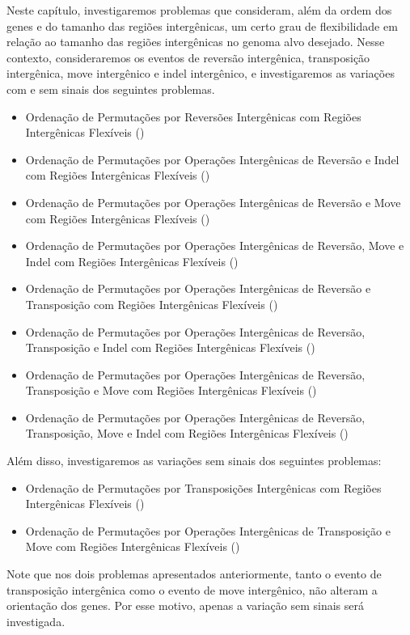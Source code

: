
Neste capítulo, investigaremos problemas que consideram, além da ordem dos genes e do tamanho das regiões intergênicas, um certo grau de flexibilidade em relação ao tamanho das regiões intergênicas no genoma alvo desejado. Nesse contexto, consideraremos os eventos de reversão intergênica, transposição intergênica, move intergênico e indel intergênico, e investigaremos as variações com e sem sinais dos seguintes problemas.

\begin{itemize}
  \item Ordenação de Permutações por Reversões Intergênicas com Regiões Intergênicas Flexíveis (\SbFIR)
  \item Ordenação de Permutações por Operações Intergênicas de Reversão e Indel com Regiões Intergênicas Flexíveis (\SbFIRI)
  \item Ordenação de Permutações por Operações Intergênicas de Reversão e Move com Regiões Intergênicas Flexíveis (\SbFIRM)
  \item Ordenação de Permutações por Operações Intergênicas de Reversão, Move e Indel com Regiões Intergênicas Flexíveis (\SbFIRMI)
  \item Ordenação de Permutações por Operações Intergênicas de Reversão e Transposição com Regiões Intergênicas Flexíveis (\SbFIRT)
  \item Ordenação de Permutações por Operações Intergênicas de Reversão, Transposição e Indel com Regiões Intergênicas Flexíveis (\SbFIRTI)
  \item Ordenação de Permutações por Operações Intergênicas de Reversão, Transposição e Move com Regiões Intergênicas Flexíveis (\SbFIRTM)
  \item Ordenação de Permutações por Operações Intergênicas de Reversão, Transposição, Move e Indel com Regiões Intergênicas Flexíveis (\SbFIRTMI)
\end{itemize}

Além disso, investigaremos as variações sem sinais dos seguintes problemas:

\begin{itemize}
  \item Ordenação de Permutações por Transposições Intergênicas com Regiões Intergênicas Flexíveis (\SbFIT)
  \item Ordenação de Permutações por Operações Intergênicas de Transposição e Move com Regiões Intergênicas Flexíveis (\SbFITM)
\end{itemize}

Note que nos dois problemas apresentados anteriormente, tanto o evento de transposição intergênica como o evento de move intergênico, não alteram a orientação dos genes. Por esse motivo, apenas a variação sem sinais será investigada.

